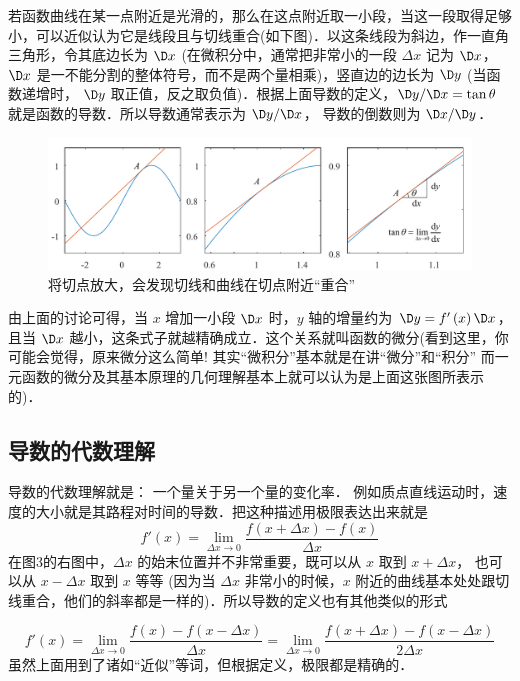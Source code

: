 若函数曲线在某一点附近是光滑的，那么在这点附近取一小段，当这一段取得足够小，可以近似认为它是线段且与切线重合(如下图)．以这条线段为斜边，作一直角三角形，令其底边长为 $\D x$ (在微积分中，通常把非常小的一段 $\Delta x$ 记为 $\D x$，  $\D x$ 是一不能分割的整体符号，而不是两个量相乘)，竖直边的边长为 $\D y$ (当函数递增时， $\D y$ 取正值，反之取负值)．根据上面导数的定义，$\D y/\D x = \tan \theta $ 就是函数的导数．所以导数通常表示为 $\D y/\D x$， 导数的倒数则为 $\D x/\D y$． 

\begin{figure}[ht]
\centering
\includegraphics[width=14cm]{./figures/Der2.pdf}
\caption{将切点放大，会发现切线和曲线在切点附近“重合”}
\end{figure}




由上面的讨论可得，当 $x$ 增加一小段 $\D x$ 时，$y$ 轴的增量约为 $\D y = f'\left( x \right)\D x$，且当 $\D x$ 越小，这条式子就越精确成立．这个关系就叫函数的微分(看到这里，你可能会觉得，原来微分这么简单! 其实“微积分”基本就是在讲“微分”和“积分” 而一元函数的微分及其基本原理的几何理解基本上就可以认为是上面这张图所表示的)．


\subsection{导数的代数理解}

导数的代数理解就是： 一个量关于另一个量的变化率． 例如质点直线运动时，速度的大小就是其路程对时间的导数．把这种描述用极限表达出来就是
\begin{equation}\label{Der_eq2}
f'\left( x \right) = \mathop {\lim }\limits_{\Delta x \to 0} \frac{{f\left( {x + \Delta x} \right) - f\left( x \right)}}{{\Delta x}}
\end{equation}
在图3的右图中，$\Delta x$ 的始末位置并不非常重要，既可以从 $x$ 取到 $x + \Delta x$， 也可以从 $x - \Delta x$  取到 $x$ 等等 (因为当 $\Delta x$ 非常小的时候，$x$ 附近的曲线基本处处跟切线重合，他们的斜率都是一样的)．所以导数的定义也有其他类似的形式

\begin{equation}
f'\left( x \right) = \mathop {\lim }\limits_{\Delta x \to 0} \frac{{f\left( x \right) - f\left( {x - \Delta x} \right)}}{{\Delta x}} = \mathop {\lim }\limits_{\Delta x \to 0} \frac{{f\left( {x + \Delta x} \right) - f\left( {x - \Delta x} \right)}}{{2\Delta x}}
\end{equation}
虽然上面用到了诸如“近似”等词，但根据定义，极限都是精确的．



